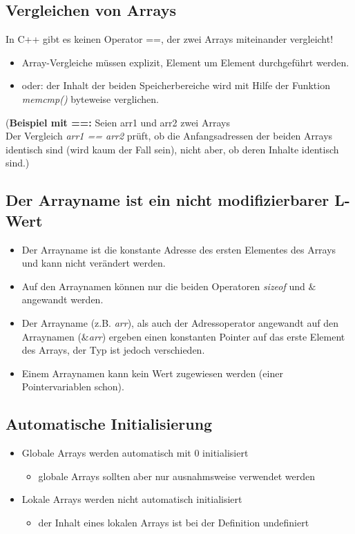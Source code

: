 \subsection{Vergleichen von Arrays}
\begin{hinweis}
In C++ gibt es keinen Operator ==, der zwei Arrays miteinander vergleicht!
\end{hinweis}
\begin{itemize}
	\item Array-Vergleiche müssen explizit, Element um Element durchgeführt werden.
	\item oder: der Inhalt der beiden Speicherbereiche wird mit Hilfe der Funktion \emph{memcmp()} byteweise verglichen.
\end{itemize}
\vspace{\baselineskip}
(\textbf{Beispiel mit ==:} Seien arr1 und arr2 zwei Arrays\\Der Vergleich \emph{arr1 == arr2} prüft, ob die Anfangsadressen der beiden Arrays identisch sind (wird kaum der Fall sein), nicht aber, ob deren Inhalte identisch sind.)
	
\subsection{Der Arrayname ist ein nicht modifizierbarer L-Wert}
\begin{itemize}
	\item Der Arrayname ist die konstante Adresse des ersten Elementes des Arrays und kann nicht verändert werden.
	\item Auf den Arraynamen können nur die beiden Operatoren \emph{sizeof} und $\&$ angewandt werden.
	\item Der Arrayname (z.B. \emph{arr}), als auch der Adressoperator angewandt auf den Arraynamen (\emph{$\&$arr}) ergeben einen konstanten Pointer auf das erste Element des Arrays, der Typ ist jedoch verschieden.
	\item Einem Arraynamen kann kein Wert zugewiesen werden (einer Pointervariablen schon).
\end{itemize}

\subsection{Automatische Initialisierung}
\begin{itemize}
	\item Globale Arrays werden automatisch mit 0 initialisiert
	\begin{itemize}
		\item globale Arrays sollten aber nur ausnahmsweise verwendet werden
	\end{itemize}
	\item Lokale Arrays werden nicht automatisch initialisiert
	\begin{itemize}
		\item der Inhalt eines lokalen Arrays ist bei der Definition undefiniert
	\end{itemize}
\end{itemize}

